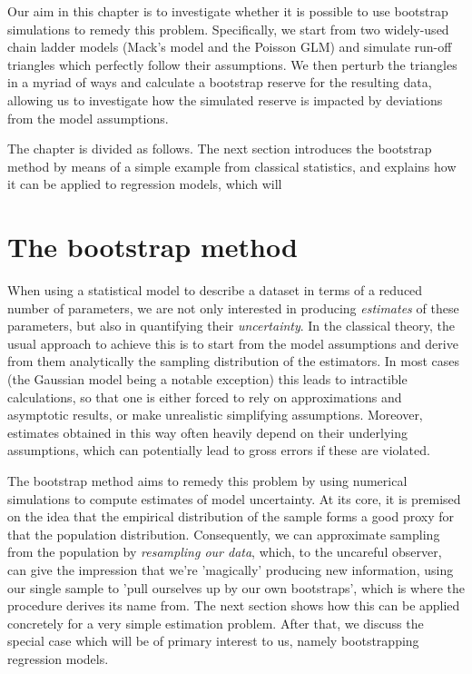 \documentclass[a4paper]{book}
\theoremstyle{plain}
\begin{document}
Our aim in this chapter is to investigate whether it is possible to use bootstrap simulations to remedy this problem.  Specifically, we start from two widely-used chain ladder models (Mack's model and the Poisson GLM) and simulate run-off triangles which perfectly follow their assumptions. We then perturb the triangles in a myriad of ways and calculate a bootstrap reserve for the resulting data, allowing us to investigate how the simulated reserve is impacted by deviations from the model assumptions.

The chapter is divided as follows. The next section introduces the bootstrap method by means of a simple example from classical statistics, and explains how it can be applied to regression models, which will

\section{The bootstrap method} \label{sec:boot}

When using a statistical model to describe a dataset in terms of a reduced number of parameters, we are not only interested in producing \emph{estimates} of these parameters, but also in quantifying their \emph{uncertainty}. In the classical theory, the usual approach to achieve this is to start from the model assumptions and derive from them analytically the sampling distribution of the estimators. In most cases (the Gaussian model being a notable exception) this leads to intractible calculations, so that one is either forced to rely on approximations and asymptotic results, or make unrealistic simplifying assumptions. Moreover, estimates obtained in this way often heavily depend on their underlying assumptions, which can potentially lead to gross errors if these are violated.

The bootstrap method aims to remedy this problem by using numerical simulations to compute estimates of model uncertainty. At its core, it is premised on the idea that the empirical distribution of the sample forms a good proxy for that the population distribution. Consequently, we can approximate sampling from the population by \emph{resampling our data}, which, to the uncareful observer, can give the impression that we're 'magically' producing new information, using our single sample to 'pull ourselves up by our own bootstraps', which is where the procedure derives its name from. The next section shows how this can be applied concretely for a very simple estimation problem. After that, we discuss the special case which will be of primary interest to us, namely bootstrapping regression models.
\end{document}
